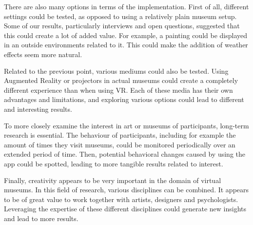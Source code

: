 \documentclass[a4paper]{article}
\begin{document}
There are also many options in terms of the implementation. First of all, different settings could be tested, as opposed to using a relatively plain museum setup. Some of our results, particularly interviews and open questions, suggested that this could create a lot of added value. For example, a painting could be displayed in an outside environments related to it. This could make the addition of weather effects seem more natural.

Related to the previous point, various mediums could also be tested. Using Augmented Reality or projectors in actual museums could create a completely different experience than when using VR. Each of these media has their own advantages and limitations, and exploring various options could lead to different and interesting results.

To more closely examine the interest in art or museums of participants, long-term research is essential. The behaviour of participants, including for example the amount of times they visit museums, could be monitored periodically over an extended period of time. Then, potential behavioral changes caused by using the app could be spotted, leading to more tangible results related to interest.

Finally, creativity appears to be very important in the domain of virtual museums. In this field of research, various disciplines can be combined. It appears to be of great value to work together with artists, designers and psychologists. Leveraging the expertise of these different disciplines could generate new insights and lead to more results.


\end{document}
